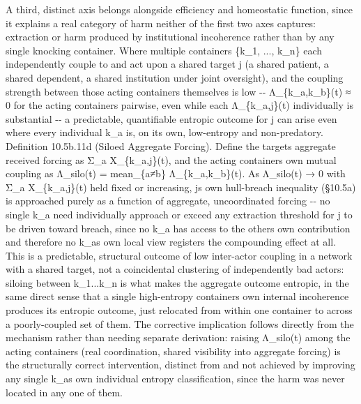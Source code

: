 \documentclass[
]{article}
\begin{document}
A third, distinct axis belongs alongside efficiency and homeostatic
function, since it explains a real category of harm neither of the first
two axes captures: extraction or harm produced by institutional
incoherence rather than by any single knocking container. Where multiple
containers \{k\_1, ..., k\_n\} each independently couple to and act upon
a shared target j (a shared patient, a shared dependent, a shared
institution under joint oversight), and the coupling strength between
those acting containers themselves is low -\/- Λ\_\{k\_a,k\_b\}(t) ≈ 0
for the acting containers pairwise, even while each Λ\_\{k\_a,j\}(t)
individually is substantial -\/- a predictable, quantifiable entropic
outcome for j can arise even where every individual k\_a is, on its own,
low-entropy and non-predatory. Definition 10.5b.11d (Siloed Aggregate
Forcing). Define the targets aggregate received forcing as Σ\_a
X\_\{k\_a,j\}(t), and the acting containers own mutual coupling as
Λ\_silo(t) = mean\_\{a≠b\} Λ\_\{k\_a,k\_b\}(t). As Λ\_silo(t) → 0 with
Σ\_a X\_\{k\_a,j\}(t) held fixed or increasing, js own hull-breach
inequality (§10.5a) is approached purely as a function of aggregate,
uncoordinated forcing -\/- no single k\_a need individually approach or
exceed any extraction threshold for j to be driven toward breach, since
no k\_a has access to the others own contribution and therefore no k\_as
own local view registers the compounding effect at all. This is a
predictable, structural outcome of low inter-actor coupling in a network
with a shared target, not a coincidental clustering of independently bad
actors: siloing between k\_1...k\_n is what makes the aggregate outcome
entropic, in the same direct sense that a single high-entropy containers
own internal incoherence produces its entropic outcome, just relocated
from within one container to across a poorly-coupled set of them. The
corrective implication follows directly from the mechanism rather than
needing separate derivation: raising Λ\_silo(t) among the acting
containers (real coordination, shared visibility into aggregate forcing)
is the structurally correct intervention, distinct from and not achieved
by improving any single k\_as own individual entropy classification,
since the harm was never located in any one of them.
\end{document}

